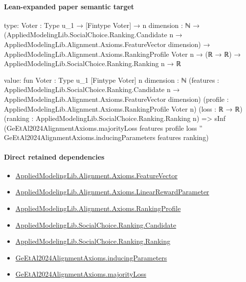 \documentclass[10pt]{article}
\begin{document}
\paragraph{Lean-expanded paper semantic target}
\begin{ReviewVerbatim}
type:
{Voter : Type u_1} →
  [Fintype Voter] →
    {n dimension : ℕ} →
      (AppliedModelingLib.SocialChoice.Ranking.Candidate n →
          AppliedModelingLib.Alignment.Axioms.FeatureVector dimension) →
        AppliedModelingLib.Alignment.Axioms.RankingProfile Voter n →
          (ℝ → ℝ) → AppliedModelingLib.SocialChoice.Ranking.Ranking n → ℝ

value:
fun {Voter : Type u_1} [Fintype Voter] {n dimension : ℕ}
    (features :
      AppliedModelingLib.SocialChoice.Ranking.Candidate n → AppliedModelingLib.Alignment.Axioms.FeatureVector dimension)
    (profile : AppliedModelingLib.Alignment.Axioms.RankingProfile Voter n) (loss : ℝ → ℝ)
    (ranking : AppliedModelingLib.SocialChoice.Ranking.Ranking n) =>
  sInf
    (GeEtAl2024AlignmentAxioms.majorityLoss features profile loss ''
      GeEtAl2024AlignmentAxioms.inducingParameters features ranking)
\end{ReviewVerbatim}

\paragraph{Direct retained dependencies}
\begin{itemize}\raggedright
\item \hyperlink{library-prerequisite-a0b67c6a143b0b13}{Applied\allowbreak{}Modeling\allowbreak{}Lib.\allowbreak{}Alignment.\allowbreak{}Axioms.\allowbreak{}Feature\allowbreak{}Vector}
\item \hyperlink{library-prerequisite-d58203ca3f4a8c05}{Applied\allowbreak{}Modeling\allowbreak{}Lib.\allowbreak{}Alignment.\allowbreak{}Axioms.\allowbreak{}Linear\allowbreak{}Reward\allowbreak{}Parameter}
\item \hyperlink{library-prerequisite-9bded048a60dfe0a}{Applied\allowbreak{}Modeling\allowbreak{}Lib.\allowbreak{}Alignment.\allowbreak{}Axioms.\allowbreak{}Ranking\allowbreak{}Profile}
\item \hyperlink{library-prerequisite-8c0e6c25845ae78a}{Applied\allowbreak{}Modeling\allowbreak{}Lib.\allowbreak{}Social\allowbreak{}Choice.\allowbreak{}Ranking.\allowbreak{}Candidate}
\item \hyperlink{library-prerequisite-5cde54446d1ae021}{Applied\allowbreak{}Modeling\allowbreak{}Lib.\allowbreak{}Social\allowbreak{}Choice.\allowbreak{}Ranking.\allowbreak{}Ranking}
\item \hyperlink{governing-declaration-ac8b17ecadb35195}{Ge\allowbreak{}Et\allowbreak{}Al2024\allowbreak{}Alignment\allowbreak{}Axioms.\allowbreak{}inducing\allowbreak{}Parameters}
\item \hyperlink{paper-prerequisite-8892d6fc4aee77f3}{Ge\allowbreak{}Et\allowbreak{}Al2024\allowbreak{}Alignment\allowbreak{}Axioms.\allowbreak{}majority\allowbreak{}Loss}
\end{itemize}
\end{document}
